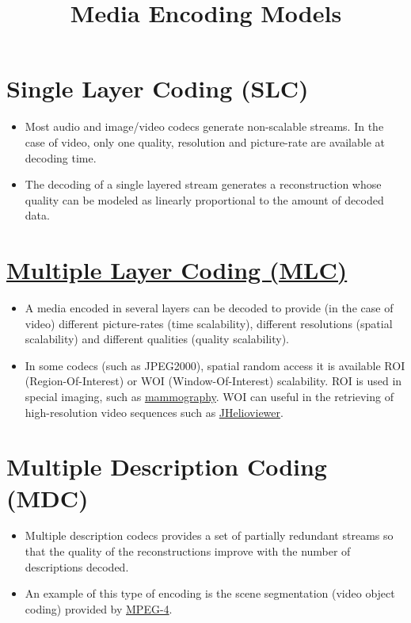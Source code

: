 \title{Media Encoding Models}

\maketitle
\tableofcontents

\section{Single Layer Coding (SLC)}
\begin{itemize}
\item Most audio and image/video codecs generate non-scalable
  streams. In the case of video, only one quality, resolution and
  picture-rate are available at decoding time.
\item The decoding of a single layered stream generates a
  reconstruction whose quality can be modeled as linearly proportional
  to the amount of decoded data.
\end{itemize}

\section{\href{http://eeweb.poly.edu/~yao/EL6123/scalablecoding.pdf}{Multiple Layer Coding (MLC)}}
\begin{itemize}
\item A media encoded in several layers can be decoded to provide (in
  the case of video) different picture-rates (time scalability),
  different resolutions (spatial scalability) and different qualities
  (quality scalability).
\item In some codecs (such as JPEG2000), spatial random access it is
  available ROI (Region-Of-Interest) or WOI (Window-Of-Interest)
  scalability. ROI is used in special imaging, such as
  \href{http://en.wikipedia.org/wiki/Mammography}{mammography}. WOI
  can useful in the retrieving of high-resolution video sequences such
  as \href{http://jhelioviewer.org/linux.html}{JHelioviewer}.
\end{itemize}

\section{Multiple Description Coding (MDC)}
\begin{itemize}
\item Multiple description codecs provides a set of partially
  redundant streams so that the quality of the reconstructions improve
  with the number of descriptions decoded.
\item An example of this type of encoding is the scene segmentation
  (video object coding) provided by
  \href{http://www.cs.cf.ac.uk/Dave/MM/BSC_MM_CALLER/PDF/12_CM340_MPEG4_VIDEO.pdf}{MPEG-4}.
\end{itemize}

